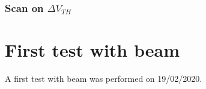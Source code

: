 \documentclass[a4paper, 11 pt]{report}
\newcommand{\Vind}{$\Delta V_{ind}$}
\newcommand{\Vthgem}{$\Delta V_{TH}$}
\newcommand{\Vdrift}{$ \Delta V_{drift}$}
\begin{document}
\subsubsection{Scan on \Vthgem}
%
%
%



\clearpage


\section{First test with beam} \label{sec:test_beam}

A first test with beam was performed on 19/02/2020. 
\end{document}
